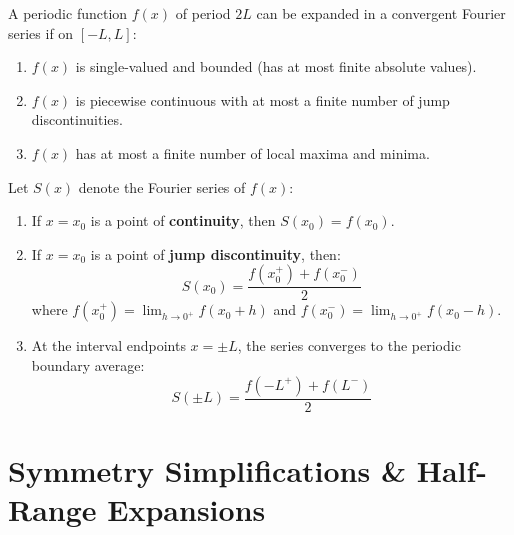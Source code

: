 \begin{theorem}
A periodic function $f(x)$ of period $2L$ can be expanded in a convergent Fourier series if on $[-L, L]$:
\begin{enumerate}[leftmargin=1.5em]
    \item $f(x)$ is single-valued and bounded (has at most finite absolute values).
    \item $f(x)$ is piecewise continuous with at most a finite number of jump discontinuities.
    \item $f(x)$ has at most a finite number of local maxima and minima.
\end{enumerate}
\end{theorem}

\begin{theorem}
Let $S(x)$ denote the Fourier series of $f(x)$:
\begin{enumerate}[leftmargin=1.5em]
    \item If $x = x_0$ is a point of \textbf{continuity}, then $S(x_0) = f(x_0)$.
    \item If $x = x_0$ is a point of \textbf{jump discontinuity}, then:
    \begin{equation}
    S(x_0) = \frac{f(x_0^+) + f(x_0^-)}{2}
    \end{equation}
    where $f(x_0^+) = \lim_{h\to 0^+} f(x_0 + h)$ and $f(x_0^-) = \lim_{h\to 0^+} f(x_0 - h)$.
    \item At the interval endpoints $x = \pm L$, the series converges to the periodic boundary average:
    \begin{equation}
    S(\pm L) = \frac{f(-L^+) + f(L^-)}{2}
    \end{equation}
\end{enumerate}
\end{theorem}

\section{Symmetry Simplifications \& Half-Range Expansions}

